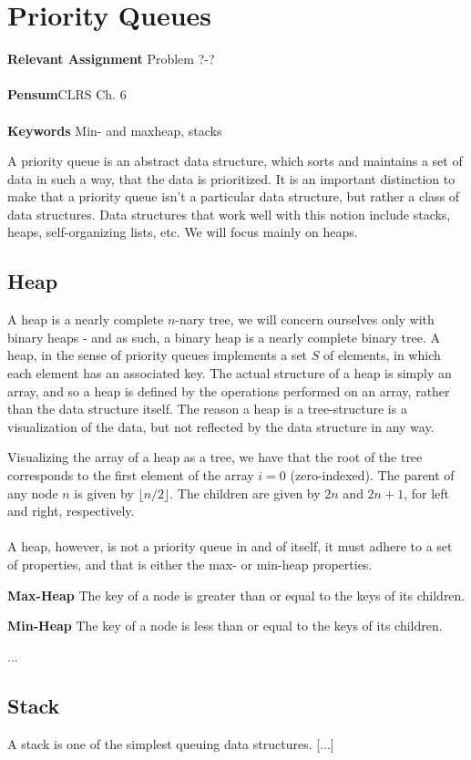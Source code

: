 
\chapter{Priority Queues}
\label{ch:priorityqueues}

\textbf{Relevant Assignment} Problem ?-?\\\\
\textbf{Pensum}CLRS Ch. 6\\\\
\textbf{Keywords} Min- and maxheap, stacks
\vspace{1in}

\noindent A priority queue is an abstract data structure, which sorts and
maintains a set of data in such a way, that the data is prioritized. It is an
important distinction to make that a priority queue isn't a particular data
structure, but rather a class of data structures. Data structures that work
well with this notion include stacks, heaps, self-organizing lists, etc.
We will focus mainly on heaps.

\section{Heap}
A heap is a nearly complete $n$-nary tree, we will concern ourselves only with
binary heaps - and as such, a binary heap is a nearly complete binary tree. A
heap, in the sense of priority queues implements a set $S$ of elements, in
which each element has an associated key. The actual structure of a heap is
simply an array, and so a heap is defined by the operations performed on an
array, rather than the data structure itself. The reason a heap is a
tree-structure is a visualization of the data, but not reflected by the data
structure in any way.

Visualizing the array of a heap as a tree, we have that the root of the tree
corresponds to the first element of the array $i = 0$ (zero-indexed). The
parent of any node $n$ is given by $\lfloor n/2 \rfloor$. The children are
given by $2n$ and $2n + 1$, for left and right, respectively.
\\\\
A heap, however, is not a priority queue in and of itself, it must adhere to
a set of properties, and that is either the max- or min-heap properties.

\begin{description}
	\item \textbf{Max-Heap} The key of a node is greater than or equal to the
keys of its children.
	\item \textbf{Min-Heap} The key of a node is less than or equal to the
keys of its children.
\end{description}
...

\section{Stack}
A stack is one of the simplest queuing data structures. [...]


